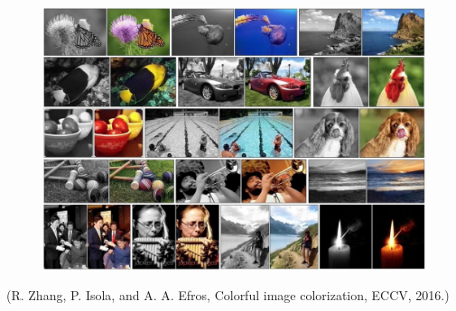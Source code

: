 \documentclass{report}
\begin{document}
\begin{example}
    \begin{figure}[H]
        \centering
        \includegraphics[width=1.0\textwidth]{.././assets/8.10.png}
    \end{figure}

    (R. Zhang, P. Isola, and A. A. Efros, Colorful image colorization, ECCV, 2016.)
\end{example}
\end{document}
